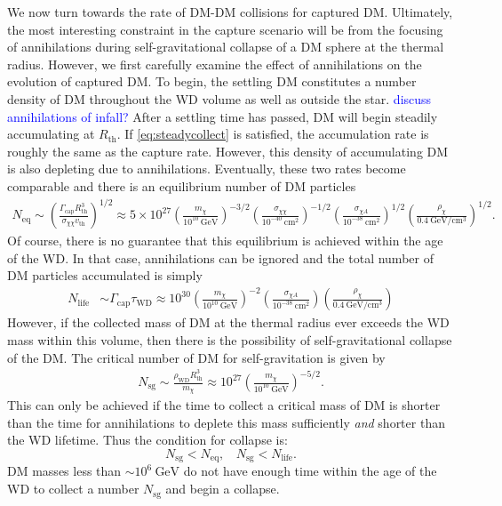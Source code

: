 \documentclass[preprintnumbers,amsmath,amssymb,prd,superscriptaddress]{revtex4}
\newcommand{\GeV}{\text{GeV}}
\newcommand{\cm}{\text{cm}}
\def\r{\right)}
\def\l{\left(}
\begin{document}
We now turn towards the rate of DM-DM collisions for captured DM. 
Ultimately, the most interesting constraint in the capture scenario will be from the focusing of annihilations during self-gravitational collapse of a DM sphere at the thermal radius.
However, we first carefully examine the effect of annihilations on the evolution of captured DM. 
To begin, the settling DM constitutes a number density of DM throughout the WD volume as well as outside the star. 
\textcolor{blue}{discuss annihilations of infall?}
After a settling time has passed, DM will begin steadily accumulating at $R_\text{th}$.
If \eqref{eq:steadycollect} is satisfied, the accumulation rate is roughly the same as the capture rate. 
However, this density of accumulating DM is also depleting due to annihilations. 
Eventually, these two rates become comparable and there is an equilibrium number of DM particles
\begin{align}
N_\text{eq} \sim \l \frac{\Gamma_\text{cap} R_\text{th}^3}{\sigma_{\chi \chi} v_\text{th}} \r^{1/2} \approx 5 \times 10^{27} \l \frac{m_\chi}{10^{10} ~\GeV} \r^{-3/2} \l \frac{\sigma_{\chi \chi}}{10^{-40} ~\cm^2} \r^{-1/2}  \l \frac{\sigma_{\chi A}}{10^{-38} ~\cm^2} \r^{1/2} \l \frac{\rho_\chi}{0.4 ~\GeV/\cm^3} \r^{1/2}.
\end{align}
Of course, there is no guarantee that this equilibrium is achieved within the age of the WD. 
In that case, annihilations can be ignored and the total number of DM particles accumulated is simply
\begin{align}
N_\text{life} &\sim \Gamma_\text{cap} \tau_\text{WD} \approx 10^{30}  \l \frac{m_\chi}{10^{10} ~\GeV} \r^{-2}  \l \frac{\sigma_{\chi A}}{10^{-38} ~\cm^2} \r \l \frac{\rho_\chi}{0.4 ~\GeV/\cm^3} \r
\end{align}
However, if the collected mass of DM at the thermal radius ever exceeds the WD mass within this volume, then there is the possibility of self-gravitational collapse of the DM.
The critical number of DM for self-gravitation is given by
\begin{align}
\label{eq:Ncore}
    N_\text{sg} \sim \frac{\rho_\text{WD} R^3_\text{th}}{m_\chi} \approx 10^{27} \l \frac{m_\chi}{10^{10} ~\GeV} \r^{-5/2}.
\end{align}
This can only be achieved if the time to collect a critical mass of DM is shorter than the time for annihilations to deplete this mass sufficiently \emph{and} shorter than the WD lifetime. 
Thus the condition for collapse is:
\begin{equation}
\label{eq:collapsecondition}
N_\text{sg} < N_\text{eq}, ~~~~ N_\text{sg} < N_\text{life}. 
\end{equation}
DM masses less than $\sim 10^{6} ~\GeV$ do not have enough time within the age of the WD to collect a number $N_\text{sg}$ and begin a collapse.
\end{document}
